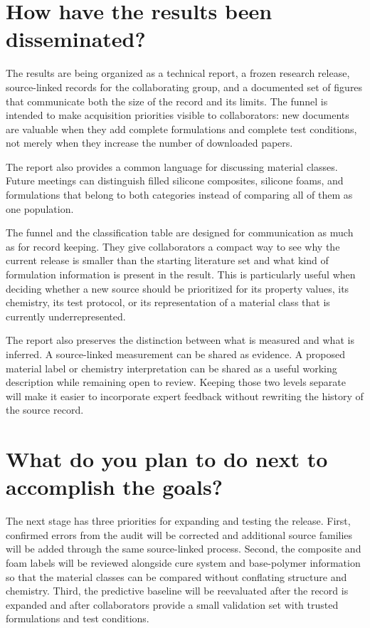 \documentclass[10pt]{article}
\begin{document}
\section{How have the results been disseminated?}
The results are being organized as a technical report, a frozen research
release, source-linked records for the collaborating group, and a documented
set of figures that communicate both the size of the record and its limits.
The funnel is intended to make acquisition priorities visible to collaborators:
new documents are valuable when they add complete formulations and complete
test conditions, not merely when they increase the number of downloaded
papers.

The report also provides a common language for discussing material classes.
Future meetings can distinguish filled silicone composites, silicone foams,
and formulations that belong to both categories instead of comparing all of
them as one population.

The funnel and the classification table are designed for communication as
much as for record keeping. They give collaborators a compact way to see why
the current release is smaller than the starting literature set and what kind
of formulation information is present in the result. This is particularly
useful when deciding whether a new source should be prioritized for its
property values, its chemistry, its test protocol, or its representation of a
material class that is currently underrepresented.

The report also preserves the distinction between what is measured and what
is inferred. A source-linked measurement can be shared as evidence. A proposed
material label or chemistry interpretation can be shared as a useful working
description while remaining open to review. Keeping those two levels separate
will make it easier to incorporate expert feedback without rewriting the
history of the source record.

\section{What do you plan to do next to accomplish the goals?}
The next stage has three priorities for expanding and testing the release.
First, confirmed errors from the audit
will be corrected and additional source families will be added through the
same source-linked process. Second, the composite and foam labels will be
reviewed alongside cure system and base-polymer information so that the
material classes can be compared without conflating structure and chemistry.
Third, the predictive baseline will be reevaluated after the record is
expanded and after collaborators provide a small validation set with trusted
formulations and test conditions.
\end{document}
